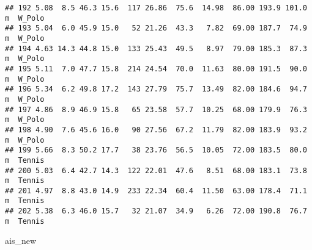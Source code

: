 \documentclass[
]{article}
\newenvironment{Shaded}{\begin{snugshade}}{\end{snugshade}}
\newcommand{\NormalTok}[1]{#1}
\begin{document}
\begin{verbatim}
## 192 5.08  8.5 46.3 15.6  117 26.86  75.6  14.98  86.00 193.9 101.0   m  W_Polo
## 193 5.04  6.0 45.9 15.0   52 21.26  43.3   7.82  69.00 187.7  74.9   m  W_Polo
## 194 4.63 14.3 44.8 15.0  133 25.43  49.5   8.97  79.00 185.3  87.3   m  W_Polo
## 195 5.11  7.0 47.7 15.8  214 24.54  70.0  11.63  80.00 191.5  90.0   m  W_Polo
## 196 5.34  6.2 49.8 17.2  143 27.79  75.7  13.49  82.00 184.6  94.7   m  W_Polo
## 197 4.86  8.9 46.9 15.8   65 23.58  57.7  10.25  68.00 179.9  76.3   m  W_Polo
## 198 4.90  7.6 45.6 16.0   90 27.56  67.2  11.79  82.00 183.9  93.2   m  W_Polo
## 199 5.66  8.3 50.2 17.7   38 23.76  56.5  10.05  72.00 183.5  80.0   m  Tennis
## 200 5.03  6.4 42.7 14.3  122 22.01  47.6   8.51  68.00 183.1  73.8   m  Tennis
## 201 4.97  8.8 43.0 14.9  233 22.34  60.4  11.50  63.00 178.4  71.1   m  Tennis
## 202 5.38  6.3 46.0 15.7   32 21.07  34.9   6.26  72.00 190.8  76.7   m  Tennis
\end{verbatim}

\begin{Shaded}
\begin{Highlighting}[]
\NormalTok{ais\_new}
\end{Highlighting}
\end{Shaded}
\end{document}

